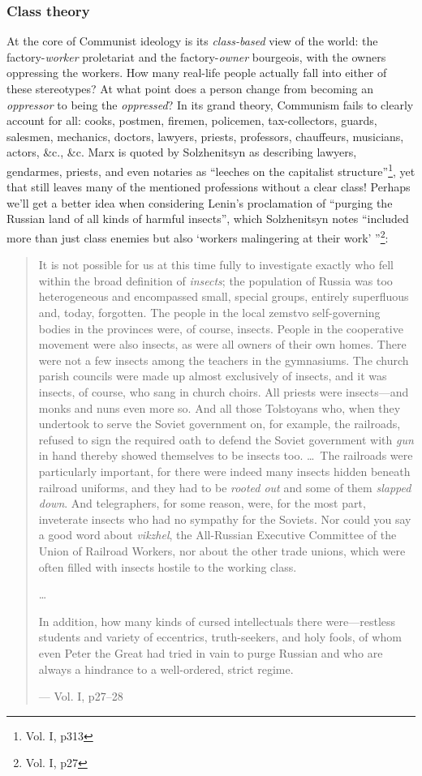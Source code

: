 \documentclass{article}
\begin{document}
\subsubsection{Class theory}
At the core of Communist ideology is its \emph{class-based} view of the world: the factory-\emph{worker} proletariat and the factory-\emph{owner} bourgeois, with the owners oppressing the workers.  How many real-life people actually fall into either of these stereotypes?  At what point does a person change from becoming an \emph{oppressor} to being the \emph{oppressed}?  In its grand theory, Communism fails to clearly account for all: cooks, postmen, firemen, policemen, tax-collectors, guards, salesmen, mechanics, doctors, lawyers, priests, professors, chauffeurs, musicians, actors, \&c., \&c.  Marx is quoted by Solzhenitsyn as describing lawyers, gendarmes, priests, and even notaries as ``leeches on the capitalist structure''\footnote{Vol. I, p313}, yet that still leaves many of the mentioned professions without a clear class!  Perhaps we'll get a better idea when considering Lenin's proclamation of ``purging the Russian land of all kinds of harmful insects'', which Solzhenitsyn notes ``included more than just class enemies but also `workers malingering at their work' ''\footnote{Vol. I, p27}:

\begin{quote}
It is not possible for us at this time fully to investigate exactly who fell within the broad definition of \emph{insects}; the population of Russia was too heterogeneous and encompassed small, special groups, entirely superfluous and, today, forgotten.  The people in the local zemstvo self-governing bodies in the provinces were, of course, insects.  People in the cooperative movement were also insects, as were all owners of their own homes.  There were not a few insects among the teachers in the gymnasiums.  The church parish councils were made up almost exclusively of insects, and it was insects, of course, who sang in church choirs.  All priests were insects---and monks and nuns even more so.  And all those Tolstoyans who, when they undertook to serve the Soviet government on, for example, the railroads, refused to sign the required oath to defend the Soviet government with \emph{gun} in hand thereby showed themselves to be insects too.  \ldots~The railroads were particularly important, for there were indeed many insects hidden beneath railroad uniforms, and they had to be \emph{rooted out} and some of them \emph{slapped down}.  And telegraphers, for some reason, were, for the most part, inveterate insects who had no sympathy for the Soviets.  Nor could you say a good word about \emph{vikzhel}, the All-Russian Executive Committee of the Union of Railroad Workers, nor about the other trade unions, which were often filled with insects hostile to the working class.

\ldots

In addition, how many kinds of cursed intellectuals there were---restless students and variety of eccentrics, truth-seekers, and holy fools, of whom even Peter the Great had tried in vain to purge Russian and who are always a hindrance to a well-ordered, strict regime.

--- Vol. I, p27--28
\end{quote}
\end{document}
